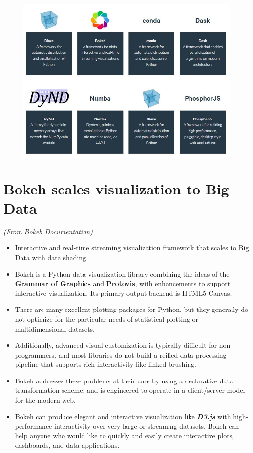 \documentclass[12pt, a4paper]{report}
\begin{document}
\begin{figure}[h!]
\centering
\includegraphics[width=0.9\linewidth]{images/00-continuum-projects}
\end{figure}
\newpage
{
	\Large
\section*{Bokeh scales visualization to Big Data}
\textit{(From Bokeh Documentation)}
\begin{itemize}
\item Interactive and real-time streaming visualization framework that scales to Big Data with data shading

\item Bokeh is a Python data visualization library combining the ideas of the \textbf{Grammar of Graphics} and \textbf{Protovis}, with enhancements to support interactive visualization. Its primary output backend is HTML5 Canvas.

\item There are many excellent plotting packages for Python, but they generally do not optimize for the particular needs of statistical plotting or multidimensional datasets. 
\item Additionally, advanced visual customization is typically difficult for non-programmers, and most libraries do not build a reified data processing pipeline that supports rich interactivity like linked brushing. 
\item Bokeh addresses these problems at their core by using a declarative data transformation scheme, and is engineered to operate in a client/server model for the modern web.


\item Bokeh can produce elegant and interactive visualization like \textbf{\textit{D3.js}} with high-performance interactivity over very large or streaming datasets. Bokeh can help anyone who would like to quickly and easily create interactive plots, dashboards, and data applications.
\end{itemize}
}
\end{document}
